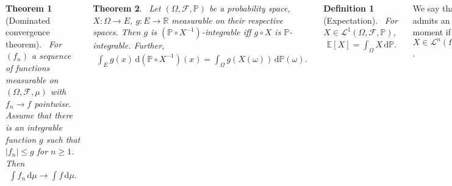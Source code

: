 \documentclass{tikzposter} %
\DeclareMathOperator{\Var}{Var}
\newtheorem{theorem}{Theorem}
\newtheorem{definition}{Definition}
\begin{document}
\begin{columns}
{    \begin{theorem}[Dominated convergence theorem]
      \ For $(f_{n})$ a sequence of functions measurable on $(\Omega, \mathcal{F}, \mu)$ with $f_{n} \to f$ pointwise. Assume that there is an integrable function $g$ such that $|f_{n}| \le g$ for $n \ge 1$. Then
      \begin{align*}
        \int f_{n} \, \mathrm{d}\mu \to \int f \, \mathrm{d}\mu.
      \end{align*}
    \end{theorem}
    \hphantom{}

    \begin{theorem}
    \ Let $(\Omega, \mathcal{F}, \mathbb{P})$ be a probability space, $X : \Omega \to E$, $g : E \to \mathbb{R}$ measurable on their respective spaces. Then $g$ is $(\mathbb{P} \circ X^{-1})$-integrable iff $g \circ X$ is $\mathbb{P}$-integrable. Further,
    \begin{align*}
      \int_{E} g(x) \, \mathrm{d}(\mathbb{P} \circ X^{-1})(x) = \int_{\Omega} g(X(\omega)) \, \mathrm{d}\mathbb{P}(\omega).
    \end{align*}
    \end{theorem}
    \hphantom{}

    \begin{definition}[Expectation]
    \ For $X \in \mathcal{L}^{1}(\Omega, \mathcal{F}, \mathbb{P})$,
    \begin{align*}
      \mathbb{E}[X] = \int_{\Omega} X \, \mathrm{d}\mathbb{P}.
    \end{align*}
    \end{definition}
    \hphantom{}

    We say that $X$ admits an $n$th moment if $X \in \mathcal{L}^{n}(\Omega, \mathcal{F}, \mathbb{P})$. \\

    \begin{definition}[Variance]
    \ For $X \in \mathcal{L}^{2}(\Omega, \mathcal{F}, \mathbb{P})$,
    \begin{align*}
      \Var(X) = \mathbb{E}\left[(X-\mathbb{E}[X])^{2}\right].
    \end{align*}
    \end{definition}
    \hphantom{}

    \begin{definition}[Standardised moment]
    \ If $X \in \mathcal{L}^{n}(\Omega, \mathcal{F}, \mathbb{P})$, the $n$th standardised moment of $X$ is
    \begin{align*}
      \mathbb{E}\left[\left(\frac{X - \mathbb{E}[X]}{\sqrt{\Var(X)}}\right)^{n}\right]
    \end{align*}
    \end{definition}
    \hphantom{}

}
\end{columns}
\end{document}
